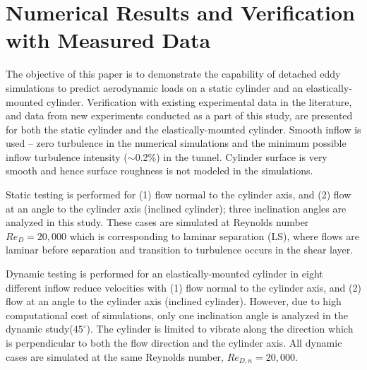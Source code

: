 \section{Numerical Results and Verification with Measured Data}
\label{sec:comp_results}
%
The objective of this paper is to demonstrate the capability of detached eddy
simulations to predict aerodynamic loads on a static cylinder and an
elastically-mounted cylinder.  Verification with existing experimental data in
the literature, and data from new experiments conducted as a part of this
study, are presented for both the static cylinder and the elastically-mounted
cylinder. Smooth inflow is used -- zero turbulence in the numerical simulations
and the minimum possible inflow turbulence intensity ($\sim$0.2\%) in the
tunnel. Cylinder surface is very smooth and hence surface roughness is not
modeled in the simulations.

Static testing is performed for (1) flow normal to the cylinder axis, and (2)
flow at an angle to the cylinder axis (inclined cylinder); three inclination
angles are analyzed in this study. These cases are simulated at Reynolds number
$Re_D=20,000$ which is corresponding to laminar separation (LS), where flows
are laminar before separation and transition to turbulence occurs in the shear
layer.

Dynamic testing is performed for an elastically-mounted cylinder in eight
different inflow reduce velocities with (1) flow normal to the cylinder axis,
and (2) flow at an angle to the cylinder axis (inclined cylinder). However, due
to high computational cost of simulations, only one inclination angle is
analyzed in the dynamic study($45^\circ$). The cylinder is limited to vibrate
along the direction which is perpendicular to both the flow direction and the
cylinder axis. All dynamic cases are simulated at the same Reynolds number,
$Re_{D,n}=20,000$.



